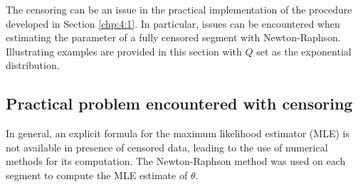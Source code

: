 The censoring can be an issue in the practical implementation of the procedure developed in Section \ref{chp:4:1}. In particular, issues can be encountered when estimating the parameter of a fully censored segment with Newton-Raphson. Illustrating examples are provided in this section with $Q$ set as the exponential distribution.

\subsection{Practical problem encountered with censoring}\label{chp:4:cens_seg}


In general, an explicit formula for the maximum likelihood estimator (MLE) is not available in presence of censored data, leading to the use of numerical methods for its computation. The Newton-Raphson method was used on each segment to compute the MLE estimate of $\theta$. 

